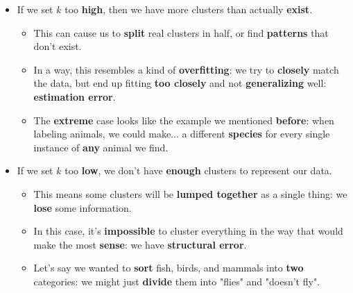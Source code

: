         \begin{itemize}
            \item If we set $k$ too \textbf{high}, then we have more clusters than actually \textbf{exist}.
                \begin{itemize}
                    \item This can cause us to \textbf{split} real clusters in half, or find \textbf{patterns} that don't exist.
                    
                    \item In a way, this resembles a kind of \textbf{overfitting}: we try to \textbf{closely} match the data, but end up fitting \textbf{too closely} and not \textbf{generalizing} well: \textbf{estimation error}.
                    
                    \item \miniex The \textbf{extreme} case looks like the example we mentioned \textbf{before}: when labeling animals, we could make... a different \textbf{species} for every single instance of \textbf{any} animal we find. 
                \end{itemize}
            \item If we set $k$ too \textbf{low}, we don't have \textbf{enough} clusters to represent our data.
                \begin{itemize}
                    \item This means some clusters will be \textbf{lumped together} as a single thing: we \textbf{lose} some information.
                    
                    \item In this case, it's \textbf{impossible} to cluster everything in the way that would make the most \textbf{sense}: we have \textbf{structural error}.
                    
                    \item \miniex Let's say we wanted to \textbf{sort} fish, birds, and mammals into \textbf{two} categories: we might just \textbf{divide} them into "flies" and "doesn't fly".
                        \\
                \end{itemize}
        \end{itemize}
        
